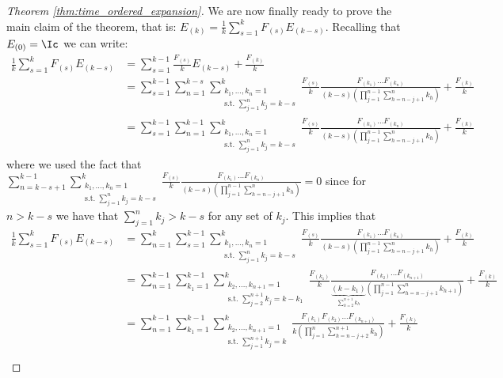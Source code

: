 \begin{proof}[Theorem \ref{thm:time_ordered_expansion}]
    We are now finally ready to prove the main claim of the theorem, that is: \(E_{(k)} = \frac{1}{k}\sum_{s=1}^{k}F_{(s)}E_{(k-s)}.\)
    Recalling that $E_{(0)}=\Ic$ we can write:
    \begin{align*}
        \frac{1}{k}\sum_{s=1}^{k} F_{(s)} E_{(k-s)}  &= \sum_{s=1}^{k-1} \frac{F_{(s)}}{k} E_{(k-s)} + \frac{F_{(k)}}{k} \\
        &= \sum_{s=1}^{k-1} \sum_{n=1}^{k-s} \sum_{\substack{{k_1,\dots,k_{n} = 1}\\{\text{s.t. }\sum_{j=1}^{n}k_{j}=k-s}}}^{k} \frac{F_{(s)}}{k} \frac{ F_{(k_1)}\dots F_{(k_n)}}{(k-s)(\prod_{j=1}^{n-1} \sum_{h=n-j+1}^n k_h)} + \frac{F_{(k)}}{k} \\
        &= \sum_{s=1}^{k-1}\sum_{n=1}^{k-1} \sum_{\substack{{k_1,\dots,k_{n} = 1}\\{\text{s.t. }\sum_{j=1}^{n}k_{j}=k-s}}}^{k} \frac{F_{(s)}}{k} \frac{ F_{(k_1)}\dots F_{(k_n)}}{(k-s)(\prod_{j=1}^{n-1} \sum_{h=n-j+1}^n k_h)} + \frac{F_{(k)}}{k}  
    \end{align*}
    where we used the fact that $\sum_{n=k-s+1}^{k-1} \sum_{\substack{{k_1,\dots,k_{n} = 1}\\{\text{s.t. }\sum_{j=1}^{n}k_{j}=k-s}}}^{k} \frac{F_{(s)}}{k} \frac{ F_{(k_1)}\dots F_{(k_n)}}{(k-s)(\prod_{j=1}^{n-1} \sum_{h=n-j+1}^n k_h)} = 0$ since for $n>k-s$ we have that $\sum_{j=1}^{n}k_{j} > k-s$ for any set of $k_j$. This implies that
    \begin{align*}
        \frac{1}{k}\sum_{s=1}^{k} F_{(s)}E_{(k-s)}  
        &= \sum_{n=1}^{k} \sum_{s=1}^{k-1} \sum_{\substack{{k_1,\dots,k_{n} = 1}\\{\text{s.t. }\sum_{j=1}^{n}k_{j}=k-s}}}^{k} \frac{F_{(s)}}{k} \frac{ F_{(k_1)}\dots F_{(k_n)}}{(k-s)(\prod_{j=1}^{n-1} \sum_{h=n-j+1}^n k_h)} +\frac{F_{(k)}}{k} \\
        &= \sum_{n=1}^{k-1} \sum_{k_1=1}^{k-1} \sum_{\substack{{k_2,\dots,k_{n+1} = 1}\\{\text{s.t. }\sum_{j=2}^{n+1}k_{j}=k-k_1}}}^{k} \frac{F_{(k_1)}}{k} \frac{ F_{(k_2)}\dots F_{(k_{n+1})}}{\underbrace{(k-k_1)}_{\sum_{h=2}^{n+1}k_h}(\prod_{j=1}^{n-1} \sum_{h=n-j+1}^n k_{h+1})} +\frac{F_{(k)}}{k} \\
        &= \sum_{n=1}^{k-1} \sum_{k_1=1}^{k-1} \sum_{\substack{{k_2,\dots,k_{n+1} = 1}\\{\text{s.t. }\sum_{j=1}^{n+1}k_{j}=k}}}^{k} \frac{F_{(k_1)} F_{(k_2)}\dots F_{(k_{n+1})}}{k(\prod_{j=1}^{n} \sum_{h=n-j+2}^{n+1} k_{h})} +\frac{F_{(k)}}{k} \\

\end{align*}
\end{proof}
